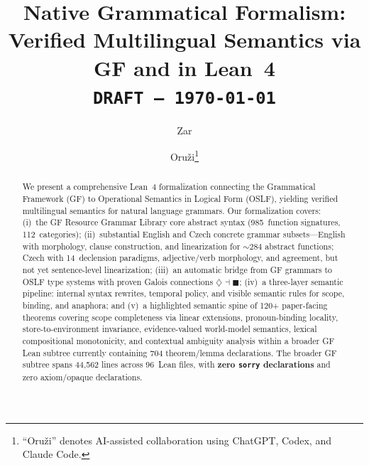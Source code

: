 \documentclass[11pt]{article}
\title{Native Grammatical Formalism:\\
  Verified Multilingual Semantics via GF and \OSLF{} in Lean~4\\[4pt]
  \large\texttt{DRAFT --- \today}}
\author{Zar \and Oru\v{z}i\footnote{``Oru\v{z}i'' denotes AI-assisted collaboration using ChatGPT, Codex, and Claude Code.}}
\newcommand{\code}[1]{\texttt{#1}}
\newcommand{\Dia}{\ensuremath{\diamondsuit}}
\newcommand{\Bx}{\ensuremath{\blacksquare}}
\newcommand{\OSLF}{\textup{OSLF}}
\newcommand{\GF}{\textup{GF}}
\begin{document}
\maketitle

\begin{abstract}
We present a comprehensive Lean~4 formalization connecting the Grammatical
Framework (\GF{}) to Operational Semantics in Logical Form (\OSLF{}), yielding
verified multilingual semantics for natural language grammars.  Our
formalization covers: (i)~the \GF{} Resource Grammar Library core abstract
syntax (985~function signatures, 112~categories); (ii)~substantial English and Czech concrete
grammar subsets---English with morphology, clause construction, and linearization
for ${\sim}284$ abstract functions; Czech with 14~declension paradigms,
adjective/verb morphology, and agreement, but not yet sentence-level linearization; (iii)~an automatic bridge
from \GF{} grammars to \OSLF{} type systems with proven Galois connections
$\Dia \dashv \Bx$; (iv)~a three-layer semantic pipeline: internal syntax
rewrites, temporal policy, and visible semantic rules for scope,
binding, and anaphora; and (v)~a highlighted semantic spine of
120+ paper-facing theorems covering scope completeness via linear
extensions, pronoun-binding locality, store-to-environment invariance,
evidence-valued world-model semantics, lexical compositional monotonicity,
and contextual ambiguity analysis within a
broader \GF{} Lean subtree currently containing 704 theorem/lemma declarations.
The broader \GF{} subtree spans 44,562 lines across 96~Lean files, with
\textbf{zero \code{sorry} declarations} and zero axiom/opaque declarations.
\end{abstract}
\end{document}
